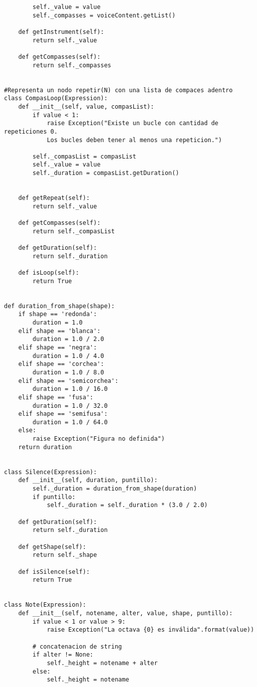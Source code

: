 \begin{verbatim}
        self._value = value
        self._compasses = voiceContent.getList()

    def getInstrument(self):
        return self._value

    def getCompasses(self):
        return self._compasses


#Representa un nodo repetir(N) con una lista de compaces adentro
class CompasLoop(Expression):
    def __init__(self, value, compasList):
        if value < 1:
            raise Exception("Existe un bucle con cantidad de repeticiones 0. 
            Los bucles deben tener al menos una repeticion.")

        self._compasList = compasList
        self._value = value
        self._duration = compasList.getDuration()


    def getRepeat(self):
        return self._value

    def getCompasses(self):
        return self._compasList

    def getDuration(self):
        return self._duration

    def isLoop(self):
        return True


def duration_from_shape(shape):
    if shape == 'redonda':
        duration = 1.0
    elif shape == 'blanca':
        duration = 1.0 / 2.0
    elif shape == 'negra':
        duration = 1.0 / 4.0
    elif shape == 'corchea':
        duration = 1.0 / 8.0
    elif shape == 'semicorchea':
        duration = 1.0 / 16.0
    elif shape == 'fusa':
        duration = 1.0 / 32.0
    elif shape == 'semifusa':
        duration = 1.0 / 64.0
    else:
        raise Exception("Figura no definida")
    return duration


class Silence(Expression):
    def __init__(self, duration, puntillo):
        self._duration = duration_from_shape(duration)
        if puntillo:
            self._duration = self._duration * (3.0 / 2.0)

    def getDuration(self):
        return self._duration

    def getShape(self):
        return self._shape

    def isSilence(self):
        return True


class Note(Expression):
    def __init__(self, notename, alter, value, shape, puntillo):
        if value < 1 or value > 9:
            raise Exception("La octava {0} es inválida".format(value))

        # concatenacion de string
        if alter != None:
            self._height = notename + alter
        else:
            self._height = notename


\end{verbatim}
